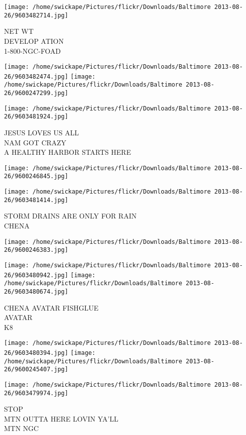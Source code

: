 \documentclass[10pt,letterpaper]{article}
\begin{document}
\vspace{0.25in}
\texttt{[image: /home/swickape/Pictures/flickr/Downloads/Baltimore 2013-08-26/9603482714.jpg]}

NET WT\\
DEVELOP ATION\\
1{-}800{-}NGC{-}FOAD
\pagebreak

\texttt{[image: /home/swickape/Pictures/flickr/Downloads/Baltimore 2013-08-26/9603482474.jpg]}
\texttt{[image: /home/swickape/Pictures/flickr/Downloads/Baltimore 2013-08-26/9600247299.jpg]}

\texttt{[image: /home/swickape/Pictures/flickr/Downloads/Baltimore 2013-08-26/9603481924.jpg]}

JESUS LOVES US ALL\\
NAM GOT CRAZY\\
A HEALTHY HARBOR STARTS HERE
\pagebreak

\texttt{[image: /home/swickape/Pictures/flickr/Downloads/Baltimore 2013-08-26/9600246845.jpg]}

\vspace{0.25in}
\texttt{[image: /home/swickape/Pictures/flickr/Downloads/Baltimore 2013-08-26/9603481414.jpg]}

STORM DRAINS ARE ONLY FOR RAIN\\
CHENA
\pagebreak

\texttt{[image: /home/swickape/Pictures/flickr/Downloads/Baltimore 2013-08-26/9600246383.jpg]}

\vspace{0.25in}
\texttt{[image: /home/swickape/Pictures/flickr/Downloads/Baltimore 2013-08-26/9603480942.jpg]}
\texttt{[image: /home/swickape/Pictures/flickr/Downloads/Baltimore 2013-08-26/9603480674.jpg]}

CHENA AVATAR FISHGLUE\\
AVATAR\\
K8
\pagebreak

\texttt{[image: /home/swickape/Pictures/flickr/Downloads/Baltimore 2013-08-26/9603480394.jpg]}
\texttt{[image: /home/swickape/Pictures/flickr/Downloads/Baltimore 2013-08-26/9600245407.jpg]}

\texttt{[image: /home/swickape/Pictures/flickr/Downloads/Baltimore 2013-08-26/9603479974.jpg]}

STOP\\
MTN OUTTA HERE LOVIN YA'LL\\
MTN NGC
\pagebreak
\end{document}
